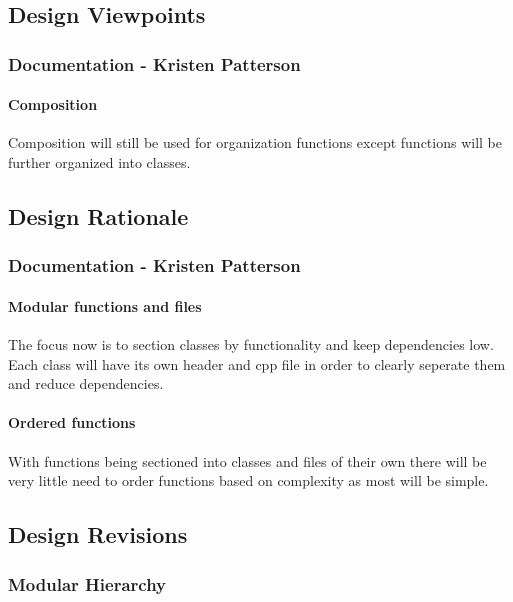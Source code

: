\subsection{Design Viewpoints}
\subsubsection{Documentation - Kristen Patterson}
\paragraph{Composition}
Composition will still be used for organization functions except functions will be further organized into classes.

\subsection{Design Rationale}
\subsubsection{Documentation - Kristen Patterson}
\paragraph{Modular functions and files}
The focus now is to section classes by functionality and keep dependencies low. Each class will have its own header and cpp file in order to clearly seperate them and reduce dependencies.
\paragraph{Ordered functions}
With functions being sectioned into classes and files of their own there will be very little need to order functions based on complexity as most will be simple.

\subsection{Design Revisions}
\subsubsection{Modular Hierarchy}
